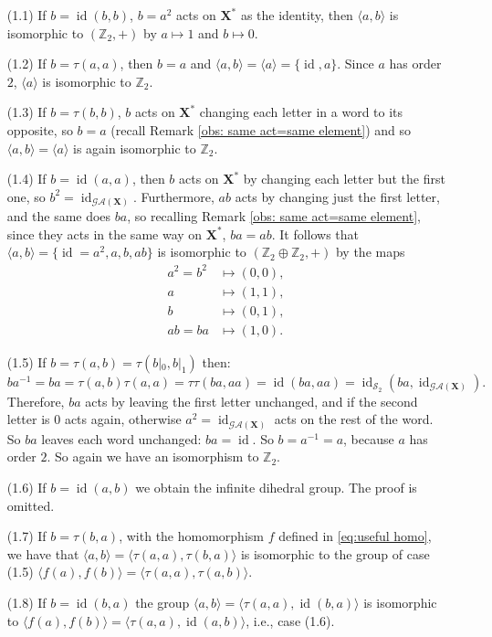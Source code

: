 \documentclass[mat1]{fmfdeloTS2.0}
\newcommand{\Z}{\mathbb Z}
\newcommand{\abece}{\mathbf{X}}			%
\newcommand{\fslovar}{\mathbf{X^*}}		%
\newcommand{\synaut}{\mathcal{GA}}	%
\DeclareMathOperator{\symm}{\mathcal{S}}		%
\DeclareMathOperator{\id}{\mathrm{id}}			%
\begin{document}
\begin{itemize}
\item[(1.1)] If $b=\id(b,b)$, $b=a^2$ acts on $\fslovar$ as the identity, then $\langle a,b\rangle $ is isomorphic to $(\Z_2,+)$ by $a\longmapsto 1$ and $b\longmapsto 0$.
\item[(1.2)] If $b=\tau(a,a)$, then $b=a$ and $\langle a,b\rangle=\langle a\rangle =\{\id,a\}$. Since $a$ has order $2$, $\langle a \rangle$ is isomorphic to $\Z_2$.
\item[(1.3)] If $b=\tau(b,b)$, $b$ acts on $\fslovar$ changing each letter in a word to its opposite, so $b=a$ (recall Remark \autoref{obs: same act=same element}) and so $\langle a,b\rangle =\langle a \rangle$ is again isomorphic to $\Z_2$.
\item[(1.4)] If $b=\id(a,a)$, then $b$ acts on $\fslovar$ by changing each letter but the first one, so $b^2=\id_{\synaut(\abece)}$. Furthermore, $ab$ acts by changing just the first letter, and the same does $ba$, so recalling Remark \autoref{obs: same act=same element}, since they acts in the same way on $\fslovar$, $ba=ab$. It follows that $\langle a,b\rangle =\{\id=a^2,a,b,ab\}$ is isomorphic to $(\Z_2\oplus\Z_2, +)$ by the maps
\begin{align*}
a^2=b^2&\longmapsto (0,0),\\
a&\longmapsto (1,1),\\
b&\longmapsto (0,1),\\
ab=ba&\longmapsto (1,0).
\end{align*}
\item[(1.5)] If $b=\tau(a,b)=\tau(b|_0,b|_1)$ then: 
$$ba^{-1}=ba=\tau(a,b)\tau(a,a)=\tau\tau(ba,aa)=\id(ba,aa)=\id_{\symm_2}(ba,\id_{\synaut(\abece)}).$$
Therefore, $ba$ acts by leaving the first letter unchanged, and if the second letter is $0$ acts again, otherwise $a^2=\id_{\synaut(\abece)}$ acts on the rest of the word. So $ba$ leaves each word unchanged: $ba=\id$. So $b=a^{-1}=a$, because $a$ has order $2$. So again we have an isomorphism to $\Z_2$.
\item[(1.6)] If $b=\id(a,b)$ we obtain the infinite dihedral group. The proof is omitted.
\item[(1.7)] If $b=\tau(b,a)$, with the homomorphism $f$ defined in \eqref{eq:useful homo}, we have that $\langle a,b \rangle=\langle \tau(a,a),\tau(b,a) \rangle$ is isomorphic to the group of case (1.5) $\langle f(a),f(b) \rangle=\langle \tau(a,a),\tau(a,b) \rangle$.
\item[(1.8)] If $b=\id(b,a)$ the group $\langle a,b \rangle=\langle \tau(a,a),\id(b,a) \rangle$ is isomorphic to $\langle f(a),f(b) \rangle=\langle \tau(a,a),\id(a,b) \rangle$, i.e., case (1.6).
\end{itemize}
\end{document}
